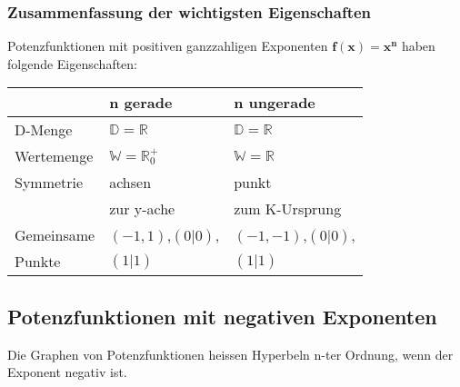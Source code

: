 \begin{multicols}{3}
    \subsubsection*{Zusammenfassung der wichtigsten Eigenschaften}
    Potenzfunktionen mit positiven ganzzahligen Exponenten $\boldsymbol{f(x) = x^n}$ haben folgende Eigenschaften: \\
    \begin{tabularx}{\columnwidth} {
            | >{\raggedright\arraybackslash}X
            | >{\raggedright\arraybackslash}X
            | >{\raggedright\arraybackslash}X |}
        \hline
                          & \textbf{n gerade}                 & \textbf{n ungerade}       \\ \hline
        D-Menge  & $\mathbb{D} = \mathbb{R}$         & $\mathbb{D} = \mathbb{R}$ \\ \hline
        Wertemenge        & $\mathbb{W} = \mathbb{R}^{+}_{0}$ & $\mathbb{W} = \mathbb{R}$ \\ \hline
        Symmetrie         & achsen                 & punkt           \\
                          & zur y-ache                        & zum K-Ursprung            \\ \hline
        Gemeinsame  & $(-1,1)$,$(0|0)$,      & $(-1,-1)$,$(0|0)$, \\ 
        Punkte& $(1|1)$          & $(1|1)$ \\ \hline
    \end{tabularx}
    \subsection*{Potenzfunktionen mit negativen Exponenten}
    Die Graphen von Potenzfunktionen heissen Hyperbeln n-ter Ordnung, wenn der Exponent negativ ist.

\end{multicols}
